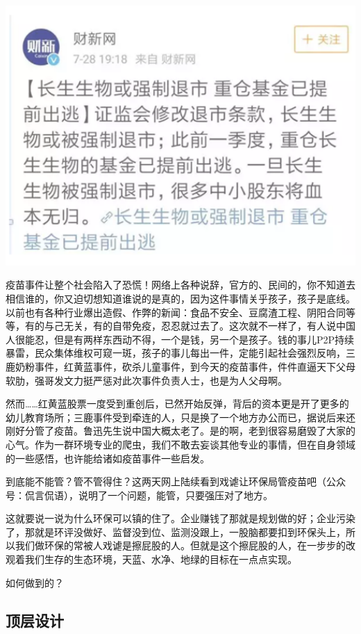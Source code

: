 \documentclass[
]{book}
\begin{document}
\includegraphics[width=6.67in]{images/fw1}

疫苗事件让整个社会陷入了恐慌！网络上各种说辞，官方的、民间的，你不知道去相信谁的，你又迫切想知道谁说的是真的，因为这件事情关乎孩子，孩子是底线。以前也有各种行业爆出造假、作弊的新闻：食品不安全、豆腐渣工程、阴阳合同等等，有的与己无关，有的自带免疫，忍忍就过去了。这次就不一样了，有人说中国人很能忍，但是有两样东西动不得，一个是钱，另一个是孩子。钱的事儿P2P持续暴雷，民众集体维权可窥一斑，孩子的事儿每出一件，定能引起社会强烈反响，三鹿奶粉事件，红黄蓝事件，砍杀儿童事件，到今天的疫苗事件，件件直逼天下父母软肋，强哥发文力挺严惩对此次事件负责人士，也是为人父母啊。

然而\ldots\ldots 红黄蓝股票一度受到重创后，已然开始反弹，背后的资本更是开了更多的幼儿教育场所；三鹿事件受到牵连的人，只是换了一个地方办公而已，据说后来还刚好分管了疫苗。鲁迅先生说中国大概太老了。是的啊，老到很容易磨毁了大家的心气。作为一群环境专业的爬虫，我们不敢去妄谈其他专业的事情，但在自身领域的一些感悟，也许能给诸如疫苗事件一些启发。

到底能不能管？管不管得住？这两天网上陆续看到戏谑让环保局管疫苗吧（公众号：侃言侃语），说明了一个问题，能管，只要强压对了地方。

这就要说一说为什么环保可以镇的住了。企业赚钱了那就是规划做的好；企业污染了，那就是环评没做好、监督没到位、监测没跟上，一股脑都要扣到环保头上，所以我们做环保的常被人戏谑是擦屁股的人。但就是这个擦屁股的人，在一步步的改观着我们生存的生态环境，天蓝、水净、地绿的目标在一点点实现。

如何做到的？

\hypertarget{ux9876ux5c42ux8bbeux8ba1}{%
\subsection{顶层设计}\label{ux9876ux5c42ux8bbeux8ba1}}
\end{document}
